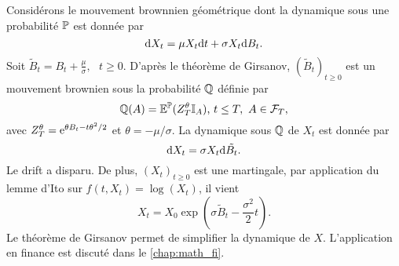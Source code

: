 \begin{ex}
Considérons le mouvement brownnien géométrique dont la dynamique sous une probabilité $\mathbb{P}$ est donnée par 
$$
\text{d} X_t = \mu X_t\text{d} t+\sigma X_t\text{d} B_t.
$$
Soit $\tilde{B}_t = B_t + \frac{\mu}{\sigma},\text{ }t\geq 0$. D'après le théorème de Girsanov, $(\tilde{B}_t)_{t\geq 0}$ est un mouvement brownien sous la probabilité $\mathbb{Q}$ définie par 
$$
\mathbb{Q}(A) = \mathbb{E}^{\mathbb{P}}(Z_T^\theta\mathbb{I}_A)\text{, }t\leq T,\text{ }A\in \mathcal{F}_T,
$$
avec $Z_T^\theta = \mathrm{e}^{\theta B_t - t\theta^2/2}$ et $\theta = -\mu / \sigma$. La dynamique sous $\mathbb{Q}$ de $X_t$ est donnée par 
$$
\text{d} X_t = \sigma X_t\text{d} \tilde{B_t}.
$$
Le drift a disparu. De plus,  $(X_t)_{t\geq 0}$ est une martingale, par application du lemme d'Ito sur $f(t, X_t) = \log(X_t)$, il vient 
$$
X_t = X_0\exp\left(\sigma \tilde{B}_t - \frac{\sigma^2}{2}t\right).
$$
Le théorème de Girsanov permet de simplifier la dynamique de $X$. L'application en finance est discuté dans le \cref{chap:math_fi}.
\end{ex}


